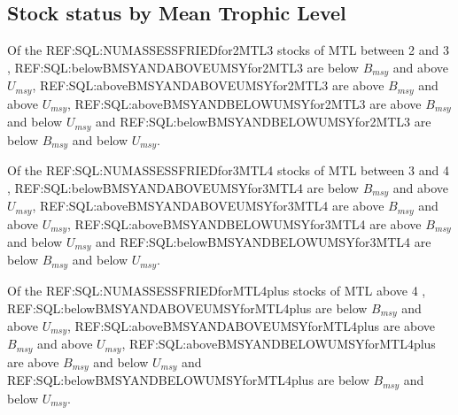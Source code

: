 \subsection*{Stock status by Mean Trophic Level}
Of the REF:SQL:NUMASSESSFRIEDfor2MTL3 stocks of MTL between 2 and 3 , REF:SQL:belowBMSYANDABOVEUMSYfor2MTL3 are below $B_{msy}$ and above $U_{msy}$, REF:SQL:aboveBMSYANDABOVEUMSYfor2MTL3 are above $B_{msy}$ and above $U_{msy}$, REF:SQL:aboveBMSYANDBELOWUMSYfor2MTL3 are above $B_{msy}$ and below $U_{msy}$ and REF:SQL:belowBMSYANDBELOWUMSYfor2MTL3 are below $B_{msy}$ and below $U_{msy}$.

Of the REF:SQL:NUMASSESSFRIEDfor3MTL4 stocks of MTL between 3 and 4 , REF:SQL:belowBMSYANDABOVEUMSYfor3MTL4 are below $B_{msy}$ and above $U_{msy}$, REF:SQL:aboveBMSYANDABOVEUMSYfor3MTL4 are above $B_{msy}$ and above $U_{msy}$, REF:SQL:aboveBMSYANDBELOWUMSYfor3MTL4 are above $B_{msy}$ and below $U_{msy}$ and REF:SQL:belowBMSYANDBELOWUMSYfor3MTL4 are below $B_{msy}$ and below $U_{msy}$.

Of the REF:SQL:NUMASSESSFRIEDforMTL4plus stocks of MTL above 4 , REF:SQL:belowBMSYANDABOVEUMSYforMTL4plus are below $B_{msy}$ and above $U_{msy}$, REF:SQL:aboveBMSYANDABOVEUMSYforMTL4plus are above $B_{msy}$ and above $U_{msy}$, REF:SQL:aboveBMSYANDBELOWUMSYforMTL4plus are above $B_{msy}$ and below $U_{msy}$ and REF:SQL:belowBMSYANDBELOWUMSYforMTL4plus are below $B_{msy}$ and below $U_{msy}$.
